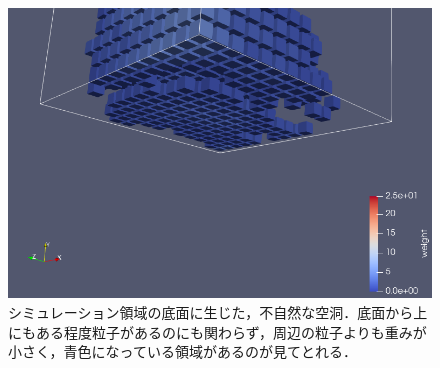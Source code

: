 \documentclass[a4j,12pt]{jreport}
\begin{document}
\begin{figure}[htbp]
\begin{center}
\includegraphics[width=140mm]{artificial_space.png}
\end{center}
\caption{シミュレーション領域の底面に生じた，不自然な空洞．底面から上にもある程度粒子があるのにも関わらず，周辺の粒子よりも重みが小さく，青色になっている領域があるのが見てとれる．}
\label{fig:space}
\end{figure}
\end{document}
